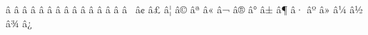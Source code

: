 \mubyte \leftarrow ^^e2^^86^^90\endmubyte %
\mubyte \uparrow ^^e2^^86^^91\endmubyte %
\mubyte \rightarrow ^^e2^^86^^92\endmubyte %
\mubyte \downarrow ^^e2^^86^^93\endmubyte %
\mubyte \leftrightarrow ^^e2^^86^^94\endmubyte %
\mubyte \updownarrow ^^e2^^86^^95\endmubyte %
\mubyte \nwarrow ^^e2^^86^^96\endmubyte %
\mubyte \nearrow ^^e2^^86^^97\endmubyte %
\mubyte \searrow ^^e2^^86^^98\endmubyte %
\mubyte \swarrow ^^e2^^86^^99\endmubyte %
\mubyte \nleftarrow ^^e2^^86^^9a\endmubyte %
\mubyte \nrightarrow ^^e2^^86^^9b\endmubyte %
\mubyte \leadsto ^^e2^^86^^9d\endmubyte %
\mubyte \twoheadleftarrow ^^e2^^86^^9e\endmubyte %
\mubyte \twoheadrightarrow ^^e2^^86^^a0\endmubyte %
\mubyte \leftarrowtail ^^e2^^86^^a2\endmubyte %
\mubyte \rightarrowtail ^^e2^^86^^a3\endmubyte %
\mubyte \mapsto ^^e2^^86^^a6\endmubyte %
\mubyte \hookleftarrow ^^e2^^86^^a9\endmubyte %
\mubyte \hookrightarrow ^^e2^^86^^aa\endmubyte %
\mubyte \looparrowright ^^e2^^86^^ab\endmubyte %
\mubyte \looparrowleft ^^e2^^86^^ac\endmubyte %
\mubyte \nleftrightarrow ^^e2^^86^^ae\endmubyte %
\mubyte \Lsh ^^e2^^86^^b0\endmubyte %
\mubyte \Rsh ^^e2^^86^^b1\endmubyte %
\mubyte \curvearrowleft ^^e2^^86^^b6\endmubyte %
\mubyte \curvearrowright ^^e2^^86^^b7\endmubyte %
\mubyte \circlearrowleft ^^e2^^86^^ba\endmubyte %
\mubyte \circlearrowright ^^e2^^86^^bb\endmubyte %
\mubyte \leftharpoonup ^^e2^^86^^bc\endmubyte %
\mubyte \leftharpoondown ^^e2^^86^^bd\endmubyte %
\mubyte \upharpoonright ^^e2^^86^^be\endmubyte %
\mubyte \upharpoonleft ^^e2^^86^^bf\endmubyte %
